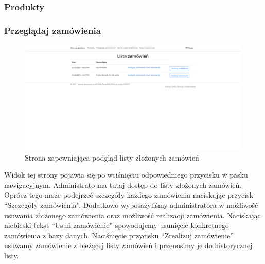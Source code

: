 \documentclass{article}
\begin{document}
\subsubsection{Produkty}

\subsubsection{Przeglądaj zamówienia}
\begin{figure}[H]
   \centering
   \includegraphics[width=0.99\textwidth,frame]{Wyglad/lista_zamowien_admin.png}
   \caption{Strona zapewniająca podgląd listy złożonych zamówień}
\end{figure}
Widok tej strony pojawia się po wciśnięciu odpowiedniego przycisku w pasku nawigacyjnym.
Administrato ma tutaj dostęp do listy złożonych zamówień. Oprócz tego może podejrzeć szczegóły
każdego zamówienia naciskając przycisk ``Szczegóły zamówienia''. Dodatkowo wyposażyliśmy
administratora w możliwość usuwania złożonego zamówienia oraz możliwość realizacji zamówienia.
Naciskając niebieski tekst ``Usuń zamówienie'' spowodujemy usunięcie konkretnego zamówienia z bazy
danych. Naciśnięcie przycisku ``Zrealizuj zamówienie'' usuwamy zamówienie z bieżącej listy zamówień
i przenosimy je do historycznej listy.
\end{document}
